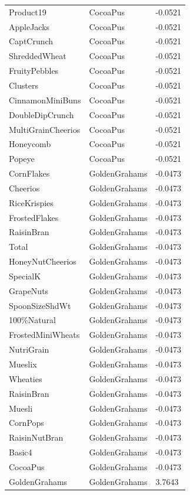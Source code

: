 \begin{table}[!htbp]
\begin{tabular}{lll}
Product19 & CocoaPus & -0.0521
\\
AppleJacks & CocoaPus & -0.0521
\\
CaptCrunch & CocoaPus & -0.0521
\\
ShreddedWheat & CocoaPus & -0.0521
\\
FruityPebbles & CocoaPus & -0.0521
\\
Clusters & CocoaPus & -0.0521
\\
CinnamonMiniBuns & CocoaPus & -0.0521
\\
DoubleDipCrunch & CocoaPus & -0.0521
\\
MultiGrainCheerios & CocoaPus & -0.0521
\\
Honeycomb & CocoaPus & -0.0521
\\
Popeye & CocoaPus & -0.0521
\\
CornFlakes & GoldenGrahams & -0.0473
\\
Cheerios & GoldenGrahams & -0.0473
\\
RiceKrispies & GoldenGrahams & -0.0473
\\
FrostedFlakes & GoldenGrahams & -0.0473
\\
RaisinBran & GoldenGrahams & -0.0473
\\
Total & GoldenGrahams & -0.0473
\\
HoneyNutCheerios & GoldenGrahams & -0.0473
\\
SpecialK & GoldenGrahams & -0.0473
\\
GrapeNuts & GoldenGrahams & -0.0473
\\
SpoonSizeShdWt & GoldenGrahams & -0.0473
\\
100\%Natural & GoldenGrahams & -0.0473
\\
FrostedMiniWheats & GoldenGrahams & -0.0473
\\
NutriGrain & GoldenGrahams & -0.0473
\\
Mueslix & GoldenGrahams & -0.0473
\\
Wheaties & GoldenGrahams & -0.0473
\\
RaisinBran & GoldenGrahams & -0.0473
\\
Muesli & GoldenGrahams & -0.0473
\\
CornPops & GoldenGrahams & -0.0473
\\
RaisinNutBran & GoldenGrahams & -0.0473
\\
Basic4 & GoldenGrahams & -0.0473
\\
CocoaPus & GoldenGrahams & -0.0473
\\
GoldenGrahams & GoldenGrahams & 3.7643
\\

\end{tabular}
\end{table}
